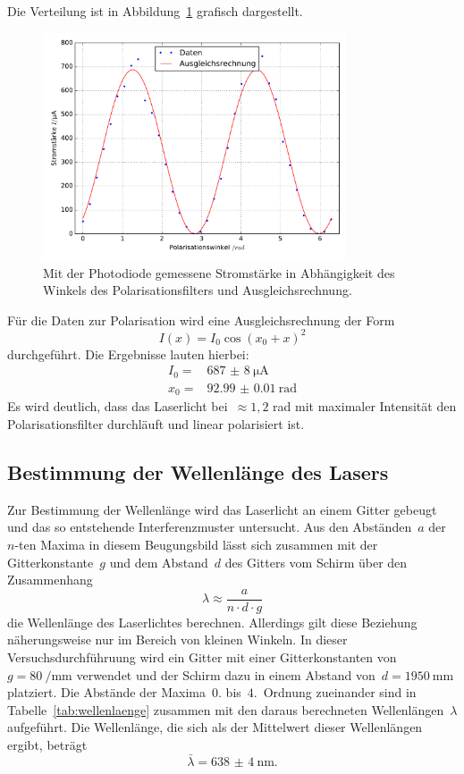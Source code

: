 %
Die Verteilung ist in Abbildung~\ref{fig:polarisation} grafisch dargestellt.
%
\begin{figure}[htb]
  \centering
  \includegraphics[width=0.8\textwidth]{auswertung/plot_polarisation.pdf}
  \caption{Mit der Photodiode gemessene Stromstärke in Abhängigkeit des Winkels des Polarisationsfilters und Ausgleichsrechnung.}
  \label{fig:polarisation}
\end{figure}
%
Für die Daten zur Polarisation wird eine Ausgleichsrechnung der Form
%
\begin{equation}
  I(x)=I_0\cos(x_0+x)^2
\end{equation}
%
durchgeführt. Die Ergebnisse lauten hierbei:
%
\begin{align*}
  I_0=&\SI{687(8)}{\micro\ampere} \\
  x_0=&\SI{92.99(1)}{}\text{rad}
\end{align*}
%
Es wird deutlich, dass das Laserlicht bei~$\approx 1,2$ rad mit maximaler Intensität den Polarisationsfilter durchläuft und linear polarisiert ist.
%
\subsection{Bestimmung der Wellenlänge des Lasers}
%
Zur Bestimmung der Wellenlänge wird das Laserlicht an einem Gitter gebeugt und das so entstehende Interferenzmuster untersucht.
Aus den Abständen~$a$ der~$n$-ten Maxima in diesem Beugungsbild lässt sich zusammen mit der Gitterkonstante~$g$ und dem Abstand~$d$ des
Gitters vom Schirm über den Zusammenhang
%
\begin{equation}
  \lambda\approx\frac{a}{n\cdot d\cdot g}
\end{equation}
%
die Wellenlänge des Laserlichtes berechnen. Allerdings gilt diese Beziehung näherungsweise nur im Bereich von kleinen Winkeln. In dieser
Versuchsdurchführuung wird ein Gitter mit einer Gitterkonstanten von~$g=\SI{80}{\per\milli\meter}$ verwendet und der Schirm dazu in einem Abstand
von~$d=\SI{1950}{\milli\meter}$ platziert. Die Abstände der Maxima~$0.$ bis~$4.$~Ordnung zueinander sind in Tabelle~\ref{tab:wellenlaenge} zusammen mit
den daraus berechneten Wellenlängen~$\lambda$ aufgeführt.
Die Wellenlänge, die sich als der Mittelwert dieser Wellenlängen ergibt, beträgt
%
\begin{equation}
  \bar{\lambda}=\SI{638(4)}{\nano\meter}.
\end{equation}

